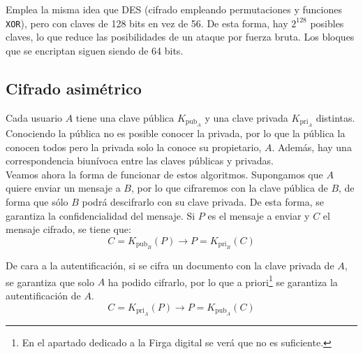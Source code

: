 Emplea la misma idea que \acrshort{DES} (cifrado empleando permutaciones y funciones \verb|XOR|), pero con claves de 128 bits en vez de 56. De esta forma, hay $2^{128}$ posibles claves, lo que reduce las posibilidades de un ataque por fuerza bruta. Los bloques que se encriptan siguen siendo de 64 bits.

\subsection{Cifrado asimétrico}
Cada usuario $A$ tiene una clave pública $K_{\text{pub}_A}$ y una clave privada $K_{\text{pri}_A}$ distintas. Conociendo la pública no es posible conocer la privada, por lo que la pública la conocen todos pero la privada solo la conoce su propietario, $A$.  Además, hay una correspondencia biunívoca entre las claves públicas y privadas.\\

Veamos ahora la forma de funcionar de estos algoritmos. Supongamos que $A$ quiere enviar un mensaje a $B$, por lo que cifraremos con la clave pública de $B$, de forma que sólo $B$ podrá descifrarlo con su clave privada. De esta forma, se garantiza la confidencialidad del mensaje. Si $P$ es el mensaje a enviar y $C$ el mensaje cifrado, se tiene que:
\begin{equation*}
    C = K_{\text{pub}_B}(P) \longrightarrow P = K_{\text{pri}_B}(C)
\end{equation*}

De cara a la autentificación, si se cifra un documento con la clave privada de $A$, se garantiza que solo $A$ ha podido cifrarlo, por lo que a priori\footnote{En el apartado dedicado a la Firga digital se verá que no es suficiente.} se garantiza la autentificación de $A$.
\begin{equation*}
    C = K_{\text{pri}_A}(P) \longrightarrow P = K_{\text{pub}_A}(C)
\end{equation*}

